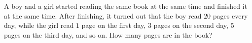 A boy and a girl started reading the same book at the same time and finished it at the same time. After finishing, it turned out that the boy read $20$ pages every day, while the girl read $1$ page on the first day, $3$ pages on the second day, $5$ pages on the third day, and so on. How many pages are in the book?
